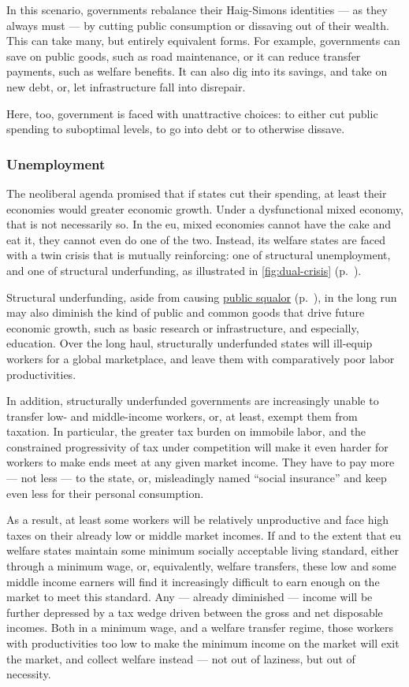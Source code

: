 In this scenario, governments rebalance their Haig-Simons identities --- as they always must --- by cutting public consumption or dissaving out of their wealth.
This can take many, but entirely equivalent forms.
For example, governments can save on public goods, such as road maintenance, or it can reduce transfer payments, such as welfare benefits.
It can also dig into its savings, and take on new debt, or, let infrastructure fall into disrepair.

Here, too, government is faced with unattractive choices:
to either cut public spending to suboptimal levels, to go into debt or to otherwise dissave.

\subsubsection{Unemployment}
The neoliberal agenda promised that if states cut their spending, at least their economies would greater economic growth.
Under a dysfunctional mixed economy, that is not necessarily so.
In the \gls{eu}, mixed economies cannot have the cake and eat it, they cannot even do one of the two.
Instead, its welfare states are faced with a twin crisis that is mutually reinforcing:
one of structural unemployment, and one of structural underfunding, as illustrated in \autoref{fig:dual-crisis} (p.~\pageref{fig:dual-crisis}).

Structural underfunding, aside from causing \hyperref[sec:public-squalor]{public squalor} (p.~\pageref{sec:public-squalor}), in the long run may also diminish the kind of public and common goods that drive future economic growth, such as basic research or infrastructure, and especially, education.
Over the long haul, structurally underfunded states will ill-equip workers for a global marketplace, and leave them with comparatively poor labor productivities.

In addition, structurally underfunded governments are increasingly unable to transfer  low- and middle-income workers, or, at least, exempt them from taxation.
In particular, the greater tax burden on immobile labor, and the constrained progressivity of tax under competition will make it even harder for workers to make ends meet at any given market income.
They have to pay more --- not less --- to the state, or, misleadingly named ``social insurance'' and keep even less for their personal consumption.

As a result, at least some workers will be relatively unproductive and face high taxes on their already low or middle market incomes.
If and to the extent that \gls{eu} welfare states maintain some minimum socially acceptable living standard, either through a minimum wage, or, equivalently, welfare transfers, these low and some middle income earners will find it increasingly difficult to earn enough on the market to meet this standard.
Any --- already diminished --- income will be further depressed by a tax wedge driven between the gross and net disposable incomes.
Both in a minimum wage, and a welfare transfer regime, those workers with productivities too low to make the minimum income on the market will exit the market, and collect welfare instead --- not out of laziness, but out of necessity.

